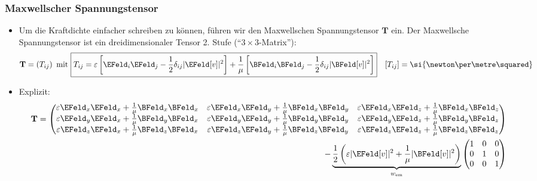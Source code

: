 \begin{frame}
  \frametitle{Maxwellscher Spannungstensor}
  \begin{itemize}[<+->]
  \item Um die Kraftdichte einfacher schreiben zu können, führen wir den \alert{Maxwellschen Spannungstensor} \(\mathbf{T}\) ein. Der Maxwellsche Spannungstensor ist ein dreidimensionaler Tensor 2. Stufe (\enquote{\(3 \times 3\)-Matrix}):
    \begin{equation*}
      \mathbf{T} = \left(T_{ij}\right) \text{ mit } \boxed{T_{ij} = \varepsilon\left[ \EFeld_i\EFeld_j-\frac{1}{2}\delta_{ij} |\EFeld[v]|^2\right] + \frac{1}{\mu} \left[\BFeld_i\BFeld_j-\frac{1}{2}\delta_{ij} |\BFeld[v]|^2\right] } \quad [T_{ij}] = \si{\newton\per\metre\squared} 
    \end{equation*}
  \item Explizit:
    \begin{equation*}
      \begin{split}
      \mathbf{T} =
      \begin{pmatrix}
        \varepsilon\EFeld_x\EFeld_x + \frac{1}{\mu}\BFeld_x\BFeld_x & \varepsilon\EFeld_x\EFeld_y + \frac{1}{\mu}\BFeld_x\BFeld_y &\varepsilon\EFeld_x\EFeld_z + \frac{1}{\mu}\BFeld_x\BFeld_z \\
        \varepsilon\EFeld_y\EFeld_x + \frac{1}{\mu}\BFeld_y\BFeld_x & \varepsilon\EFeld_y\EFeld_y + \frac{1}{\mu}\BFeld_y\BFeld_y &\varepsilon\EFeld_y\EFeld_z + \frac{1}{\mu}\BFeld_y\BFeld_z \\
        \varepsilon\EFeld_z\EFeld_x + \frac{1}{\mu}\BFeld_z\BFeld_x & \varepsilon\EFeld_z\EFeld_y + \frac{1}{\mu}\BFeld_z\BFeld_y &\varepsilon\EFeld_z\EFeld_z + \frac{1}{\mu}\BFeld_z\BFeld_z 
      \end{pmatrix}
      \\ -\underbrace{\frac{1}{2}\left(\varepsilon |\EFeld[v]|^2 + \frac{1}{\mu}|\BFeld[v]|^2\right)}_{w_\text{em}}
      \begin{pmatrix}
        1 & 0 &0\\
        0 & 1 & 0\\
        0& 0& 1
      \end{pmatrix}
      \end{split}
      \end{equation*}
  \end{itemize}
\end{frame}

